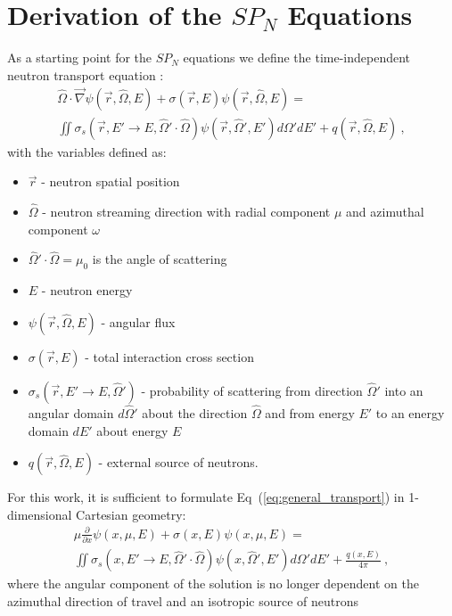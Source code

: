 \section{Derivation of the $SP_N$ Equations}
\label{sec:transport_eq}
As a starting point for the $SP_N$ equations we define the
time-independent neutron transport equation
\cite{lewis_computational_1993}:
\begin{multline}
  \hat{\Omega} \cdot \vec{\nabla} \psi(\vec{r},\hat{\Omega},E) +
  \sigma(\vec{r},E) \psi(\vec{r},\hat{\Omega},E) = \\ \iint
  \sigma_s(\vec{r},E' \rightarrow E,\hat{\Omega}' \cdot \hat{\Omega})
  \psi(\vec{r},\hat{\Omega}',E') d\Omega' dE' +
  q(\vec{r},\hat{\Omega},E)\:,
  \label{eq:general_transport}
\end{multline}
with the variables defined as:
\begin{itemize}
\item $\vec{r}$ - neutron spatial position
\item $\hat{\Omega}$ - neutron streaming direction with radial
  component $\mu$ and azimuthal component $\omega$
\item $\hat{\Omega}' \cdot \hat{\Omega} = \mu_0$ is the angle of
  scattering
\item $E$ - neutron energy
\item $\psi(\vec{r},\hat{\Omega},E)$ - angular flux
\item $\sigma(\vec{r},E)$ - total interaction cross section
\item $\sigma_s(\vec{r},E' \rightarrow E,\hat{\Omega}')$ - probability
  of scattering from direction $\hat{\Omega}'$ into an angular domain
  $d\hat{\Omega}'$ about the direction $\hat{\Omega}$ and from energy
  $E'$ to an energy domain $dE'$ about energy $E$
\item $q(\vec{r},\hat{\Omega},E)$ - external source of neutrons.
\end{itemize}
For this work, it is sufficient to formulate
Eq~(\ref{eq:general_transport}) in 1-dimensional Cartesian geometry:
\begin{multline}
  \mu \frac{\partial}{\partial x} \psi(x,\mu,E) + \sigma(x,E)
  \psi(x,\mu,E) = \\ \iint \sigma_s(x,E' \rightarrow E,\hat{\Omega}'
  \cdot \hat{\Omega}) \psi(x,\hat{\Omega}',E') d\Omega' dE' +
  \frac{q(x,E)}{4 \pi}\:,
  \label{eq:cart_1d_transport}
\end{multline}
where the angular component of the solution is no longer dependent on
the azimuthal direction of travel and an isotropic source of neutrons
